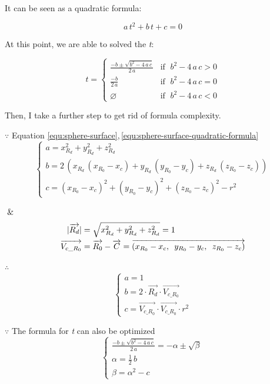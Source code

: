 It can be seen as a quadratic formula:

\begin{equation}
\label{equ:sphere-surface-quadratic-formula}
a\,t^2 + b\,t + c = 0
\end{equation}

At this point, we are able to solved the \emph{t}:

\[
t =
\begin{cases}
\frac{-b \pm \sqrt{b^2 - 4\,a\,c}}{2\,a} & \text{if }\;b^2 - 4\,a\,c > 0 \\
\frac{-b}{2\,a} & \text{if }\; b^2 - 4\,a\,c = 0 \\
\varnothing & \text{if }\; b^2 - 4\,a\,c < 0
\end{cases}
\]

Then, I take a further step to get rid of formula complexity.

$\because$ Equation \ref{equ:sphere-surface},\,\ref{equ:sphere-surface-quadratic-formula}
\[
\left\{
\begin{array}{lr}
a = x_{R_d}^2 + y_{R_d}^2 + z_{R_d}^2 \\
b = 2\,(x_{R_d}\,(x_{R_0} - x_c) + y_{R_d}\,(y_{R_0} - y_c) + z_{R_d}\,(z_{R_0} - z_c)) \\
c = (x_{R_0} - x_c)^2 + (y_{R_0} - y_c)^2 + (z_{R_0} - z_c)^2 - r^2
\end{array}
\right.
\]

$\And$
\[
\begin{array}{lr}
\begin{aligned}
\lvert \overrightarrow{R_d} \rvert &= \sqrt{x_{R_d}^2 + y_{R_d}^2 + z_{R_d}^2} = 1 \\
\overrightarrow{V_{c\_R_0}} &= \overrightarrow{R_0} - \overrightarrow{C} = \overrightarrow{(x_{R_0} - x_c,\enspace y_{R_0} - y_c,\enspace z_{R_0} - z_c)}
\end{aligned}
\end{array}
\]

$\therefore$
\[
\left\{
\begin{array}{lr}
a =1 \\
b = 2 \cdot \overrightarrow{R_d} \cdot \overrightarrow{V_{c\_R_0}} \\
c = \overrightarrow{V_{c\_R_0}} \cdot \overrightarrow{V_{c\_R_0}} \cdot r^2
\end{array}
\right.
\]

$\because$ The formula for \emph{t} can also be optimized
\[
\left\{
\begin{array}{lr}
\frac{-b \pm \sqrt{b^2 - 4\,a\,c}}{2\,a} = -\alpha \pm \sqrt{\beta} \\
\alpha = \frac{1}{2}\,b \\
\beta = \alpha^2 - c
\end{array}
\right.
\]


